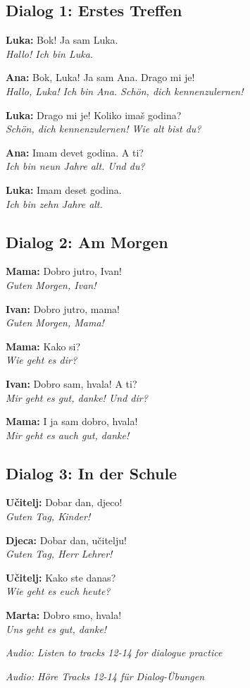\begin{culture}
\subsection*{Dialog 1: Erstes Treffen}

\textbf{Luka:} Bok! Ja sam Luka. \\
\textit{Hallo! Ich bin Luka.}

\textbf{Ana:} Bok, Luka! Ja sam Ana. Drago mi je! \\
\textit{Hallo, Luka! Ich bin Ana. Schön, dich kennenzulernen!}

\textbf{Luka:} Drago mi je! Koliko imaš godina? \\
\textit{Schön, dich kennenzulernen! Wie alt bist du?}

\textbf{Ana:} Imam devet godina. A ti? \\
\textit{Ich bin neun Jahre alt. Und du?}

\textbf{Luka:} Imam deset godina. \\
\textit{Ich bin zehn Jahre alt.}

\subsection*{Dialog 2: Am Morgen}

\textbf{Mama:} Dobro jutro, Ivan! \\
\textit{Guten Morgen, Ivan!}

\textbf{Ivan:} Dobro jutro, mama! \\
\textit{Guten Morgen, Mama!}

\textbf{Mama:} Kako si? \\
\textit{Wie geht es dir?}

\textbf{Ivan:} Dobro sam, hvala! A ti? \\
\textit{Mir geht es gut, danke! Und dir?}

\textbf{Mama:} I ja sam dobro, hvala! \\
\textit{Mir geht es auch gut, danke!}

\subsection*{Dialog 3: In der Schule}

\textbf{Učitelj:} Dobar dan, djeco! \\
\textit{Guten Tag, Kinder!}

\textbf{Djeca:} Dobar dan, učitelju! \\
\textit{Guten Tag, Herr Lehrer!}

\textbf{Učitelj:} Kako ste danas? \\
\textit{Wie geht es euch heute?}

\textbf{Marta:} Dobro smo, hvala! \\
\textit{Uns geht es gut, danke!}

\textit{Audio: Listen to tracks 12-14 for dialogue practice}

\textit{Audio: Höre Tracks 12-14 für Dialog-Übungen}
\end{culture}


